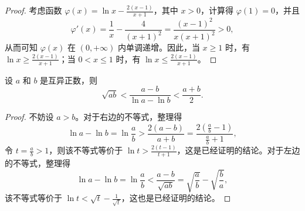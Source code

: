 \begin{proof}
    考虑函数 $\varphi(x) = \ln x - \frac{2(x-1)}{x+1}$，其中 $x > 0$，计算得 $\varphi(1) = 0$，并且
\[
\varphi'(x) = \frac{1}{x} - \frac{4}{(x+1)^2} = \frac{(x-1)^2}{x(x+1)^2} > 0,
\]
从而可知 $\varphi(x)$ 在 $(0, +\infty)$ 内单调递增。因此，当 $x \geqslant 1$ 时，有 $\ln x \geqslant \frac{2(x-1)}{x+1}$；当 $0 < x \leqslant 1$ 时，有 $\ln x \leqslant \frac{2(x-1)}{x+1}$。
\end{proof}

\begin{theorem}[对数均值不等式]\label{thm:对数均值不等式}
    设 $a$ 和 $b$ 是互异正数，则
\[
\sqrt{ab} < \frac{a-b}{\ln a - \ln b} < \frac{a+b}{2}.
\]
\end{theorem}
\begin{proof}
    不妨设 $a > b$。对于右边的不等式，整理得
\[
\ln a - \ln b = \ln \frac{a}{b} > \frac{2(a-b)}{a+b} = \frac{2\left(\frac{a}{b} - 1\right)}{\frac{a}{b} + 1},
\]
令 $t = \frac{a}{b} > 1$，则该不等式等价于 $\ln t > \frac{2(t-1)}{t+1}$，这是已经证明的结论。对于左边的不等式，整理得
\[
\ln a - \ln b = \ln \frac{a}{b} < \frac{a-b}{\sqrt{ab}} = \sqrt{\frac{a}{b}} - \sqrt{\frac{b}{a}},
\]
该不等式等价于 $\ln t < \sqrt{t} - \frac{1}{\sqrt{t}}$，这也是已经证明的结论。
\end{proof}

\clearpage
